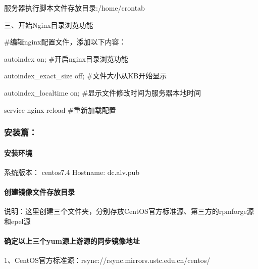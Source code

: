 \documentclass[letterpaper,10pt,english]{sphinxmanual}
\begin{document}
服务器执行脚本文件存放目录:/home/crontab

三、开始Nginx目录浏览功能

\#编辑nginx配置文件，添加以下内容：

autoindex on; \#开启nginx目录浏览功能

autoindex\_exact\_size off; \#文件大小从KB开始显示

autoindex\_localtime on; \#显示文件修改时间为服务器本地时间

service nginx reload \#重新加载配置


\subsubsection{安装篇：}
\label{\detokenize{software_manage/yum/yum_official_sync:id3}}

\paragraph{安装环境}
\label{\detokenize{software_manage/yum/yum_official_sync:id4}}
系统版本： centos7.4
Hostname: dc.alv.pub


\paragraph{创建镜像文件存放目录}
\label{\detokenize{software_manage/yum/yum_official_sync:id5}}
%
\begin{sphinxVerbatim}[commandchars=\\\{\}]
   

   

   
\end{sphinxVerbatim}

说明：这里创建三个文件夹，分别存放CentOS官方标准源、第三方的rpmforge源和epel源


\paragraph{确定以上三个yum源上游源的同步镜像地址}
\label{\detokenize{software_manage/yum/yum_official_sync:id6}}
1、CentOS官方标准源：rsync://rsync.mirrors.ustc.edu.cn/centos/
\end{document}
